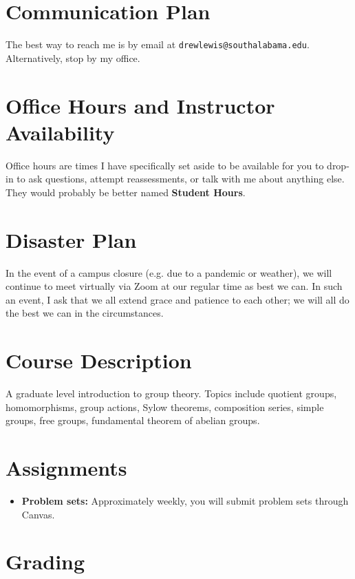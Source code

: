 \documentclass{article}
\begin{document}
\section*{\fontsize{12}{15}\selectfont Communication Plan}

The best way to reach me is by email at {\tt drewlewis@southalabama.edu}. Alternatively, stop by my office.

\section*{\fontsize{12}{15}\selectfont Office Hours and Instructor Availability}

Office hours are times I have specifically set aside to be available for you to drop-in to ask questions, attempt reassessments, or talk with me about anything else. They would probably be better named \textbf{Student Hours}.

\section*{\fontsize{12}{15}\selectfont Disaster Plan}
In the event of a campus closure (e.g. due to a pandemic or weather), we will continue to meet virtually via Zoom at our regular time as best we can. In such an event, I ask that we all extend grace and patience to each other; we will all do the best we can in the circumstances.


\section*{\fontsize{12}{15}\selectfont Course Description}
A graduate level introduction to group theory. Topics include quotient groups, homomorphisms, group actions, Sylow theorems, composition series, simple groups, free groups, fundamental theorem of abelian groups.

\section*{\fontsize{12}{15}\selectfont Assignments}
\begin{itemize}
\item \textbf{Problem sets: } Approximately weekly, you will submit problem sets through Canvas.  
\end{itemize}


\section*{\fontsize{12}{15}\selectfont Grading}
\end{document}
